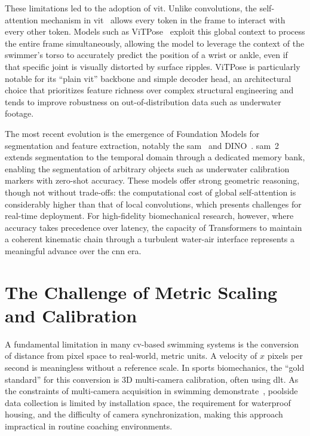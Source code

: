 These limitations led to the adoption of \gls{vit}. Unlike convolutions, the
self-attention mechanism in \gls{vit}~\cite{dosovitskiy2020image} allows every token in the frame to
interact with every other token. Models such as ViTPose~\cite{xu2022vitpose} exploit this global
context to process the entire frame simultaneously, allowing the model to leverage the context of
the swimmer's torso to accurately predict the position of a wrist or ankle, even if that
specific joint is visually distorted by surface ripples. ViTPose is particularly notable for its
``plain \gls{vit}'' backbone and simple decoder head, an architectural choice that prioritizes feature
richness over complex structural engineering and tends to improve robustness on
out-of-distribution data such as underwater footage.

The most recent evolution is the emergence of Foundation Models for segmentation and feature
extraction, notably the \gls{sam}~\cite{kirillov2023segment} and
DINO~\cite{caron2021emerging}. \gls{sam}~2 extends segmentation to the temporal domain through a
dedicated memory bank, enabling the segmentation of arbitrary objects such as underwater
calibration markers with zero-shot accuracy. These models offer strong geometric reasoning,
though not without trade-offs: the computational cost of global self-attention is considerably
higher than that of local convolutions, which presents challenges for real-time deployment. For
high-fidelity biomechanical research, however, where accuracy takes precedence over latency,
the capacity of Transformers to maintain a coherent kinematic chain through a turbulent
water-air interface represents a meaningful advance over the \gls{cnn} era.

\section{The Challenge of Metric Scaling and Calibration}
A fundamental limitation in many \gls{cv}-based swimming systems is the conversion of distance from
pixel space to real-world, metric units. A velocity of $x$ pixels per second is meaningless
without a reference scale. In sports biomechanics, the ``gold standard'' for this conversion is
3D multi-camera calibration, often using \gls{dlt}. As the constraints
of multi-camera acquisition in swimming demonstrate~\cite{sanders2015reliability}, poolside data
collection is limited by installation space, the requirement for waterproof housing, and the
difficulty of camera synchronization, making this approach impractical in routine coaching
environments.

